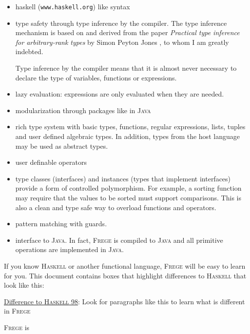 \documentclass[a4paper,twocolumn,landscape]{report}
\newcommand{\boxquote}[3]{
\begin{center}
\colorbox{#1}%
{\parbox{0.45\textwidth}{
\sf
\underline{#2}:
#3
}}
\end{center}}
\newcommand{\hasdiff}[1]{\boxquote{rot}{Difference to \haskell{} 98}{#1}}
\newcommand{\haskell}[0]{\textsc{Haskell}}
\newcommand{\frege}[0]{\textsc{Frege}}
\newcommand{\java}{\textsc{Java}}
\begin{document}
\begin{itemize}

\item haskell{} ({\tt www.haskell.org}) like syntax

\item type safety through type inference by the compiler. The
type inference mechanism is based on and derived from the paper
\emph{Practical type inference for arbitrary-rank types} by Simon
Peyton Jones \cite{ptifart}, to whom I am greatly indebted.

Type inference by the compiler means that it is
almost never necessary to declare the type of variables, functions or
expressions.

\item lazy evaluation: expressions are only evaluated when they are
needed.

\item modularization through packages like in \java{}

\item rich type system with basic types, functions, regular expressions,
lists, tuples and user defined algebraic types.
In addition, types from the host language may be used as abstract
types.

\item user definable operators

\item type classes (interfaces) and instances (types that
implement interfaces) provide a form of controlled polymorphism. For
example, a sorting function may require that the values to be sorted
must support comparisons. This is also a clean and type safe way to
overload functions and operators.

\item pattern matching with guards.

\item interface to \java{}. In fact, \frege{} is
compiled to \java{} and
all primitive operations are implemented in \java{}.


\end{itemize}

If you know \haskell{} or another functional language,
\frege{} will be easy to learn for you. This document contains boxes
that highlight differences to \haskell{} that look like this:

\hasdiff{Look for paragraphs like this to learn what is different in
\frege{}}

\frege{} is
\end{document}
